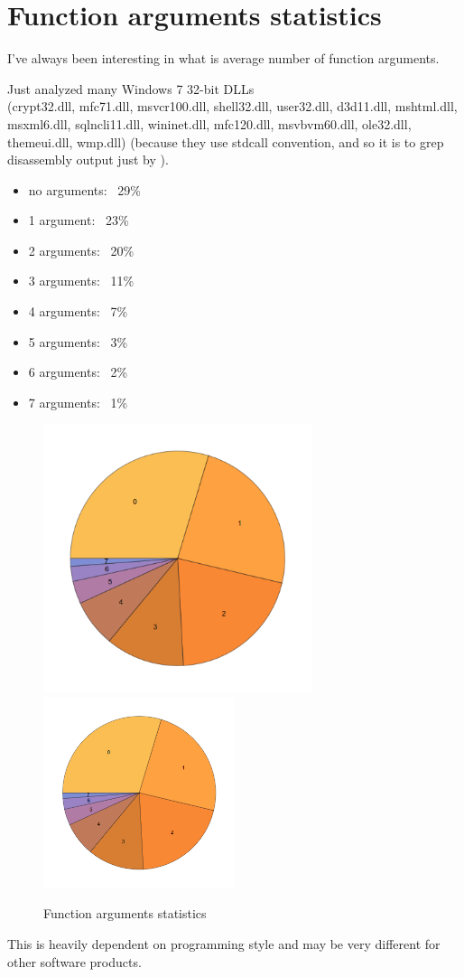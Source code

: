 \section{Function arguments statistics}
\label{args_stat}

I've always been interesting in what is average number of function arguments.

Just analyzed many Windows 7 32-bit DLLs \\
(crypt32.dll, mfc71.dll, msvcr100.dll, shell32.dll, 
user32.dll, d3d11.dll, mshtml.dll, msxml6.dll, sqlncli11.dll, wininet.dll, mfc120.dll, msvbvm60.dll, ole32.dll, themeui.dll, wmp.dll) 
(because they use stdcall convention, and so it is to grep disassembly output just by ).

\begin{itemize}
\item no arguments: ~29\%
\item 1 argument: ~23\%
\item 2 arguments: ~20\%
\item 3 arguments: ~11\%
\item 4 arguments: ~7\%
\item 5 arguments: ~3\%
\item 6 arguments: ~2\%
\item 7 arguments: ~1\%
\end{itemize}

\begin{figure}[H]
\centering
\ifdefined\ebook
\includegraphics[width=0.7\textwidth]{other/args_stat.png}
\else
\includegraphics[width=0.5\textwidth]{other/args_stat.png}
\fi
\caption{Function arguments statistics}
\end{figure}

This is heavily dependent on programming style and may be very different for other software products.

